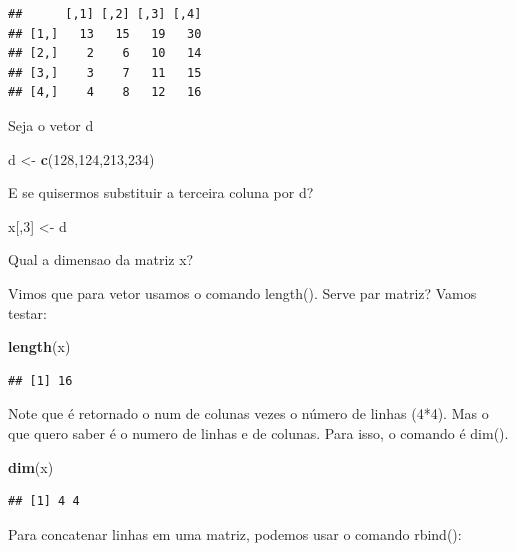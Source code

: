 \documentclass[
]{book}
\newenvironment{Shaded}{\begin{snugshade}}{\end{snugshade}}
\newcommand{\DecValTok}[1]{\textcolor[rgb]{0.00,0.00,0.81}{#1}}
\newcommand{\KeywordTok}[1]{\textcolor[rgb]{0.13,0.29,0.53}{\textbf{#1}}}
\newcommand{\NormalTok}[1]{#1}
\newcommand{\StringTok}[1]{\textcolor[rgb]{0.31,0.60,0.02}{#1}}
\begin{document}
\begin{verbatim}
##      [,1] [,2] [,3] [,4]
## [1,]   13   15   19   30
## [2,]    2    6   10   14
## [3,]    3    7   11   15
## [4,]    4    8   12   16
\end{verbatim}

Seja o vetor d

\begin{Shaded}
\begin{Highlighting}[]
\NormalTok{d <-}\StringTok{ }\KeywordTok{c}\NormalTok{(}\DecValTok{128}\NormalTok{,}\DecValTok{124}\NormalTok{,}\DecValTok{213}\NormalTok{,}\DecValTok{234}\NormalTok{)}
\end{Highlighting}
\end{Shaded}

E se quisermos substituir a terceira coluna por d?

\begin{Shaded}
\begin{Highlighting}[]
\NormalTok{x[,}\DecValTok{3}\NormalTok{] <-}\StringTok{ }\NormalTok{d}
\end{Highlighting}
\end{Shaded}

Qual a dimensao da matriz x?

Vimos que para vetor usamos o comando length(). Serve par matriz? Vamos testar:

\begin{Shaded}
\begin{Highlighting}[]
\KeywordTok{length}\NormalTok{(x)}
\end{Highlighting}
\end{Shaded}

\begin{verbatim}
## [1] 16
\end{verbatim}

Note que é retornado o num de colunas vezes o número de linhas (4*4). Mas o que quero saber é o numero de linhas e de colunas. Para isso, o comando é dim().

\begin{Shaded}
\begin{Highlighting}[]
\KeywordTok{dim}\NormalTok{(x)}
\end{Highlighting}
\end{Shaded}

\begin{verbatim}
## [1] 4 4
\end{verbatim}

Para concatenar linhas em uma matriz, podemos usar o comando rbind():
\end{document}
